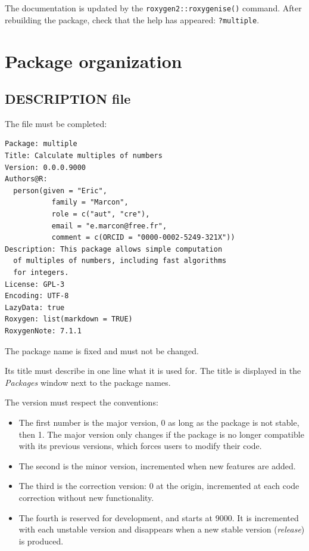 \documentclass[
  12pt,
  american,
  a4paper,
  extrafontsizes,onecolumn,openright
  ]{memoir}
\providecommand{\tightlist}{%
  \setlength{\itemsep}{0pt}\setlength{\parskip}{0pt}}
\begin{document}
The documentation is updated by the \texttt{roxygen2::roxygenise()} command.
After rebuilding the package, check that the help has appeared: \texttt{?multiple}.

\hypertarget{package-organization}{%
\section{Package organization}\label{package-organization}}

\hypertarget{sec:package-description}{%
\subsection{DESCRIPTION file}\label{sec:package-description}}

The file must be completed:

\begin{verbatim}
Package: multiple
Title: Calculate multiples of numbers
Version: 0.0.0.9000
Authors@R: 
  person(given = "Eric",
           family = "Marcon",
           role = c("aut", "cre"),
           email = "e.marcon@free.fr",
           comment = c(ORCID = "0000-0002-5249-321X"))
Description: This package allows simple computation
  of multiples of numbers, including fast algorithms
  for integers.
License: GPL-3
Encoding: UTF-8
LazyData: true
Roxygen: list(markdown = TRUE)
RoxygenNote: 7.1.1
\end{verbatim}

The package name is fixed and must not be changed.

Its title must describe in one line what it is used for.
The title is displayed in the \emph{Packages} window next to the package names.

The version must respect the conventions:

\begin{itemize}
\tightlist
\item
  The first number is the major version, 0 as long as the package is not stable, then 1.
  The major version only changes if the package is no longer compatible with its previous versions, which forces users to modify their code.
\item
  The second is the minor version, incremented when new features are added.
\item
  The third is the correction version: 0 at the origin, incremented at each code correction without new functionality.
\item
  The fourth is reserved for development, and starts at 9000.
  It is incremented with each unstable version and disappears when a new stable version (\emph{release}) is produced.
\end{itemize}
\end{document}
